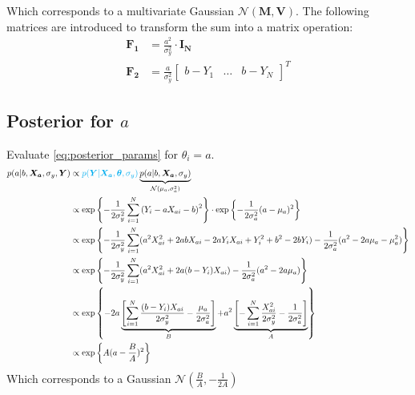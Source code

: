 \documentclass[10pt]{article}
\renewcommand{\vec}[1]{\boldsymbol{#1}}
\newcommand{\mat}[1]{\boldsymbol{#1}}
\begin{document}
Which corresponds to a multivariate Gaussian $\mathcal{N}(\vec{M}, \mat{V})$. 
The following matrices are introduced to transform the sum into a matrix operation:
\begin{align}
    \mat{F_1} &= \frac{a^2}{\sigma_y^2} \cdot \mat{I_N} \\
    \vec{F_2} &= \frac{a}{\sigma_y^2} \begin{bmatrix} b-Y_1 & \dots & b-Y_N \end{bmatrix}^T
\end{align}

\subsection{Posterior for $a$}
Evaluate \cref{eq:posterior_params} for $\theta_i= a$.
\begin{align}
    p(a|b, \vec{X_a}, \sigma_y, \vec{Y}) &\propto {\color{cyan} p(\vec{Y} | \vec{X_a}, \vec{\theta}, \sigma_y)} \underbrace{p(a | b, \vec{X_a}, \sigma_{y})}_{\mathcal{N}(\mu_a, \sigma_a^2)} \\
    &\propto \exp\left\{ - \frac{1}{2\sigma_y^2} \sum_{i=1}^N \left( Y_i - a X_{ai} - b \right)^2 \right\} \cdot \exp\left\{ - \frac{1}{2\sigma_a^2} ( a - \mu_a )^2 \right\} \\
    &\propto \exp\left\{ - \frac{1}{2\sigma_y^2} \sum_{i=1}^N (a^2 X_{ai}^2  + 2 a b X_{ai} - 2 a Y_i X_{ai} + Y_i^2 + b^2 -2 b Y_i) - \frac{1}{2\sigma_a^2} ( a^2 - 2 a \mu_a - \mu_a^2 ) \right\} \\
    &\propto \exp\left\{ - \frac{1}{2\sigma_y^2} \sum_{i=1}^N (a^2 X_{ai}^2  + 2 a (b - Y_i) X_{ai} ) - \frac{1}{2\sigma_a^2} ( a^2 - 2 a \mu_a ) \right\} \\
    &\propto \exp\left\{ - 2 a \underbrace{\left[ \sum_{i=1}^N \frac{(b - Y_i) X_{ai}}{2\sigma_y^2} - \frac{\mu_a}{2\sigma_a^2} \right]}_{B} + a^2 \underbrace{\left[ - \sum_{i=1}^N \frac{X_{ai}^2}{2\sigma_y^2}  - \frac{1}{2\sigma_a^2} \right]}_{A} \right\} \\
    &\propto \exp\left\{ A (a - \frac{B}{A})^2\right\}
\end{align}
Which corresponds to a Gaussian $\mathcal{N}(\frac{B}{A}, -\frac{1}{2A})$
\end{document}
